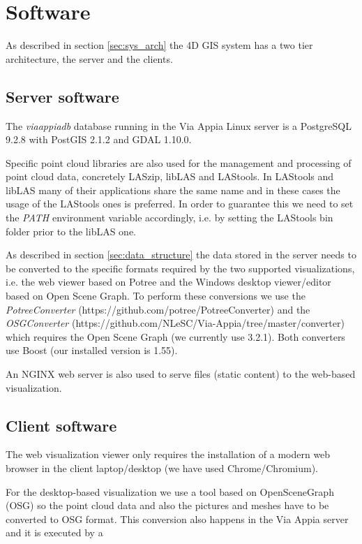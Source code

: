 \section{Software}
\label{sec:software}
As described in section \ref{sec:sys_arch} the 4D GIS system has a two tier
architecture, the server and the clients. 

\subsection{Server software}
The \textit{viaappiadb} database running in the Via Appia Linux server is a
PostgreSQL 9.2.8 with PostGIS 2.1.2 and GDAL 1.10.0.

Specific point cloud libraries are also used for the management and processing
of point cloud data, concretely LASzip, libLAS and LAStools. In LAStools and
libLAS many of their applications share the same name and in these cases the
usage of the LAStools ones is preferred. In order to guarantee this we need to
set the \textit{PATH} environment variable accordingly, i.e. by setting the
LAStools bin folder prior to the libLAS one.

As described in section \ref{sec:data_structure} the data stored in the server
needs to be converted to the specific formats required by the two supported
visualizations, i.e. the web viewer based on Potree and the Windows desktop
viewer/editor based on Open Scene Graph. To perform these conversions we use
the \textit{PotreeConverter} (https://github.com/potree/PotreeConverter) and
the \textit{OSGConverter}
(https://github.com/NLeSC/Via-Appia/tree/master/converter) which requires the
Open Scene Graph (we currently use 3.2.1). Both converters use Boost (our
installed version is 1.55).

An NGINX web server is also used to serve files (static content) to the
web-based visualization. 

\subsection{Client software}
The web visualization viewer only requires the installation of a modern web
browser in the client laptop/desktop (we have used Chrome/Chromium).

For the desktop-based visualization we use a tool based on OpenSceneGraph (OSG)
so the point cloud data and also the pictures and meshes have to be converted
to OSG format. This conversion also happens in the Via Appia server and it is
executed by a


